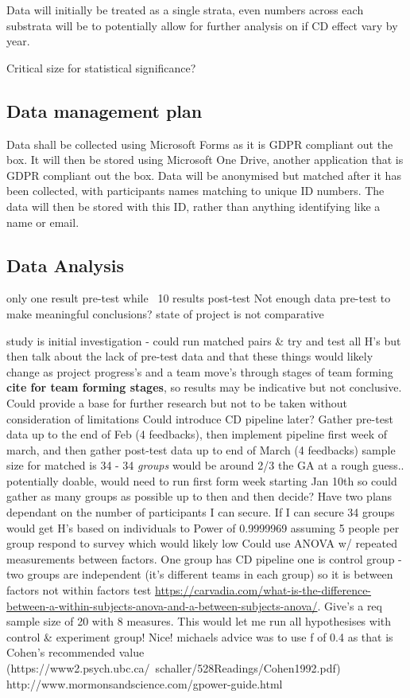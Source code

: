\documentclass[lettersize,journal]{IEEEtran}
\begin{document}
        Data will initially be treated as a single strata, even numbers across each substrata will be to potentially allow for further analysis on if CD effect vary by year.

        Critical size for statistical significance?
    
    \subsection{Data management plan}
        Data shall be collected using Microsoft Forms as it is GDPR compliant out the box. It will then be stored using Microsoft One Drive, another application that is GDPR compliant out the box.
        Data will be anonymised but matched after it has been collected, with participants names matching to unique ID numbers. The data will then be stored with this ID, rather than anything identifying like a name or email.
    
    \subsection{Data Analysis}
        only one result pre-test while ~10 results post-test
        Not enough data pre-test to make meaningful conclusions?
        state of project is not comparative

        study is initial investigation - could run matched pairs \& try and test all H's but then talk about the lack of pre-test data and that these things would likely change as  project progress's and a team move's through stages of team forming \textbf{cite for team forming stages}, so results may be indicative but not conclusive. Could provide a base for further research but not to be taken without consideration of limitations 
        Could introduce CD pipeline later? Gather pre-test data up to the end of Feb (4 feedbacks), then implement pipeline first week of march, and then gather post-test data up to end of March (4 feedbacks)
        sample size for matched is 34 - 34 \textit{groups} would be around 2/3 the GA at a rough guess.. potentially doable, would need to run first form week starting Jan 10th so could gather as many groups as possible up to then and then decide? Have two plans dependant on the number of participants I can secure. If I can secure 34 groups would get H's based on individuals to Power of 0.9999969 assuming 5 people per group respond to survey which would likely low
        Could use ANOVA w/ repeated measurements between factors. One group has CD pipeline one is control group - two groups are independent (it's different teams in each group) so it is between factors not within factors test \url{https://carvadia.com/what-is-the-difference-between-a-within-subjects-anova-and-a-between-subjects-anova/}. Give's a req sample size of 20 with 8 measures. This would let me run all hypothesises with control \& experiment group! Nice! michaels advice was to use f of 0.4 as that is Cohen's recommended value (https://www2.psych.ubc.ca/~schaller/528Readings/Cohen1992.pdf)
        http://www.mormonsandscience.com/gpower-guide.html
\end{document}
